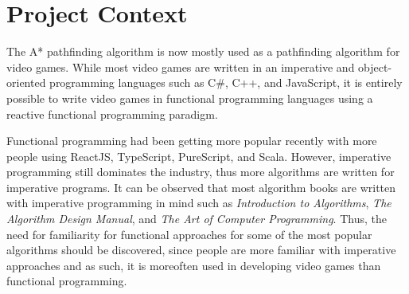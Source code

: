 






\section{Project Context}
The A* pathfinding algorithm is now mostly used as a pathfinding algorithm
for video games. While most video games are written in an imperative and 
object-oriented programming languages such as C\#, C++, and JavaScript, it is 
entirely possible to write video games in functional programming languages 
using a reactive functional programming paradigm. \cite{Cheong2006}

Functional programming had been getting more popular recently 
with more people using ReactJS, TypeScript, PureScript, and Scala.
However, imperative programming still dominates the industry, thus more algorithms 
are written for imperative programs. It can be observed that most algorithm books 
are written with imperative programming in mind such as \emph{Introduction to Algorithms}\cite{CLRS}, 
\emph{The Algorithm Design Manual}\cite{Skiena}, and \emph{The Art of Computer Programming}\cite{Knuth1997}.
Thus, the need for familiarity for functional approaches for some of the most popular 
algorithms should be discovered, since people are more familiar with imperative approaches 
and as such, it is moreoften used in developing video games than functional programming.

